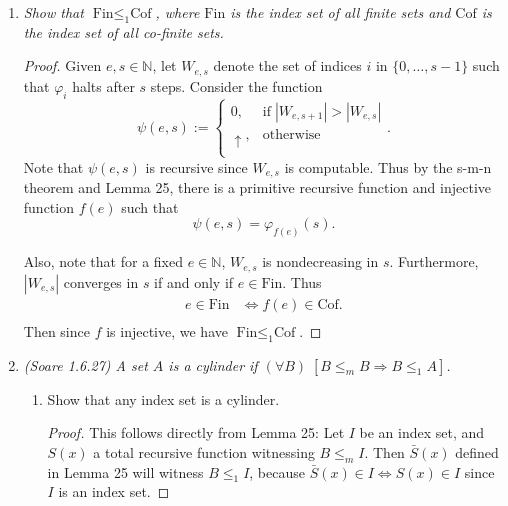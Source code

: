 \documentclass{article}
\begin{document}
\begin{enumerate}[label={\bf Q\arabic*:}]
  \item \it Show that $\text{Fin}\leq_1\text{Cof}$, where $\text{Fin}$ is
    the index set of all finite sets and $\text{Cof}$ is the index set of
    all co-finite sets.

    \begin{proof}
      Given $e,s\in\mathbb{N}$, let $W_{e,s}$ denote the set of indices $i$
      in $\{0,\ldots,s-1\}$ such that $\varphi_i$ halts after $s$ steps.
      Consider the function
      \begin{equation*}
        \psi(e,s) :=
        \begin{cases}
          0, &\text{if}\; |W_{e,s+1}|>|W_{e,s}|\\
          \uparrow, &\text{otherwise}\\
        \end{cases}.
      \end{equation*}
      Note that $\psi(e,s)$ is recursive since $W_{e,s}$ is computable.
      Thus by the s-m-n theorem and Lemma 25, there is a primitive
      recursive function and injective function $f(e)$ such that
      \[\psi(e,s)=\varphi_{f(e)}(s).\]

      Also, note that for a fixed $e\in\mathbb{N}$, $W_{e,s}$ is
      nondecreasing in $s$. Furthermore, $|W_{e,s}|$ converges in $s$ if
      and only if $e\in\text{Fin}$. Thus
      \begin{align*}
        e\in\text{Fin} &\Leftrightarrow f(e)\in\text{Cof}.\\
      \end{align*}
      Then since $f$ is injective, we have $\text{Fin}\leq_1\text{Cof}$.
    \end{proof}

  \item \it (Soare 1.6.27) A set $A$ is a cylinder if $(\forall B)\;
    [B\leq_m B \Rightarrow B\leq_1A]$.
    \begin{enumerate}[label={\bf (\roman*)}]
      \item Show that any index set is a cylinder.
        \begin{proof}
          This follows directly from Lemma 25: Let $I$ be an index set, and
          $S(x)$ a total recursive function witnessing $B\leq_m I$. Then
          $\bar{S}(x)$ defined in Lemma 25 will witness $B\leq_1 I$,
          because $\bar{S}(x)\in I\Leftrightarrow S(x)\in I$ since $I$ is
          an index set.
        \end{proof}


\end{enumerate}
\end{enumerate}
\end{document}

